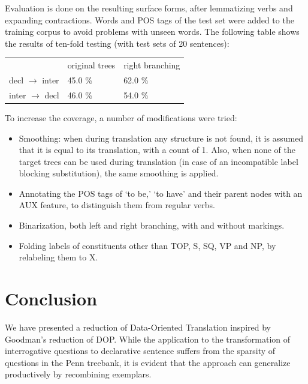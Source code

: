 \documentclass[a4paper]{article}
\theoremstyle{definition}
\begin{document}
Evaluation is done on the resulting surface forms, after lemmatizing verbs and
expanding contractions.  Words and POS tags of the test set were added to the
training corpus to avoid problems with unseen words. The following table shows
the results of ten-fold testing (with test sets of 20 sentences):

\vspace{1em}
\begin{center}
\begin{tabular}{ r l l }
\hline\hline
				& original trees & right branching \\
decl $\rightarrow$ inter 	& 45.0 \% 	& 62.0 \%  \\
inter $\rightarrow$ decl 	& 46.0 \% 	& 54.0 \%  \\
\hline
\end{tabular}
\end{center}
\vspace{1em}


To increase the coverage, a number of modifications were tried:

\begin{itemize}
\item Smoothing: when during translation any structure is not found, it is assumed that it is equal to its translation, with a count of 1. Also, when none of
	the target trees can be used during translation (in case of an incompatible label blocking substitution), the same smoothing is applied.
\item Annotating the POS tags of `to be,' `to have' and their parent nodes with an AUX feature, to distinguish them from regular verbs.
\item Binarization, both left and right branching, with and without markings.
\item Folding labels of constituents other than TOP, S, SQ, VP and NP, by relabeling them to X.
\end{itemize}

\section{Conclusion}
\label{sec:conc}
We have presented a reduction of Data-Oriented Translation inspired by
Goodman's reduction of DOP.
While the application to the transformation of interrogative questions
to declarative sentence suffers from the sparsity of questions in the
Penn treebank, it is evident that the approach can generalize
productively by recombining exemplars.



%


\end{document}
